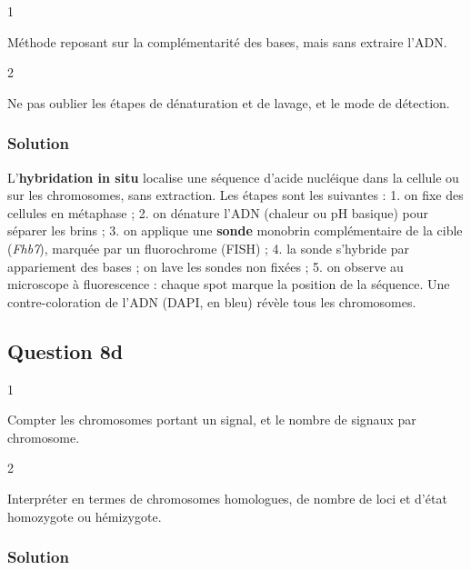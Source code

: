 \documentclass[11pt,a4paper]{article}
\begin{document}
\begin{indication}{1}

Méthode reposant sur la complémentarité des bases, mais sans extraire l'ADN.

\end{indication}

\begin{indication}{2}

Ne pas oublier les étapes de dénaturation et de lavage, et le mode de détection.

\end{indication}

\hypertarget{solution-22}{%
\subsubsection{Solution}\label{solution-22}}

L'\textbf{hybridation in situ} localise une séquence d'acide nucléique dans la cellule ou sur les chromosomes, sans extraction. Les étapes sont les suivantes :
1. on fixe des cellules en métaphase ;
2. on dénature l'ADN (chaleur ou pH basique) pour séparer les brins ;
3. on applique une \textbf{sonde} monobrin complémentaire de la cible (\emph{Fhb7}), marquée par un fluorochrome (FISH) ;
4. la sonde s'hybride par appariement des bases ; on lave les sondes non fixées ;
5. on observe au microscope à fluorescence : chaque spot marque la position de la séquence. Une contre-coloration de l'ADN (DAPI, en bleu) révèle tous les chromosomes.

\hypertarget{question-8d}{%
\subsection{Question 8d}\label{question-8d}}

\begin{indication}{1}

Compter les chromosomes portant un signal, et le nombre de signaux par chromosome.

\end{indication}

\begin{indication}{2}

Interpréter en termes de chromosomes homologues, de nombre de loci et d'état homozygote ou hémizygote.

\end{indication}

\hypertarget{solution-23}{%
\subsubsection{Solution}\label{solution-23}}
\end{document}
